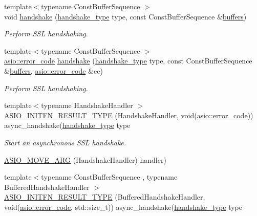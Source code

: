 \begin{DoxyCompactItemize}
{\footnotesize template$<$typename Const\+Buffer\+Sequence $>$ }\\void \hyperlink{classasio_1_1ssl_1_1stream_ae576e595f41b72459ded95b88cd870c8}{handshake} (\hyperlink{classasio_1_1ssl_1_1stream__base_a2f18813d3860bc8aee99249834d7c320}{handshake\+\_\+type} type, const Const\+Buffer\+Sequence \&\hyperlink{classasio_1_1ssl_1_1stream_aefa76c1cfe5178bd3e49d3fe06272133}{buffers})
\begin{DoxyCompactList}\small\item\em Perform S\+S\+L handshaking. \end{DoxyCompactList}\item 
{\footnotesize template$<$typename Const\+Buffer\+Sequence $>$ }\\\hyperlink{classasio_1_1error__code}{asio\+::error\+\_\+code} \hyperlink{classasio_1_1ssl_1_1stream_a7402b438c0c58c4e62bb5731fc168414}{handshake} (\hyperlink{classasio_1_1ssl_1_1stream__base_a2f18813d3860bc8aee99249834d7c320}{handshake\+\_\+type} type, const Const\+Buffer\+Sequence \&\hyperlink{classasio_1_1ssl_1_1stream_aefa76c1cfe5178bd3e49d3fe06272133}{buffers}, \hyperlink{classasio_1_1error__code}{asio\+::error\+\_\+code} \&ec)
\begin{DoxyCompactList}\small\item\em Perform S\+S\+L handshaking. \end{DoxyCompactList}\item 
{\footnotesize template$<$typename Handshake\+Handler $>$ }\\\hyperlink{classasio_1_1ssl_1_1stream_a87544b70cba88a500f12f85a3e747144}{A\+S\+I\+O\+\_\+\+I\+N\+I\+T\+F\+N\+\_\+\+R\+E\+S\+U\+L\+T\+\_\+\+T\+Y\+P\+E} (Handshake\+Handler, void(\hyperlink{classasio_1_1error__code}{asio\+::error\+\_\+code})) async\+\_\+handshake(\hyperlink{classasio_1_1ssl_1_1stream__base_a2f18813d3860bc8aee99249834d7c320}{handshake\+\_\+type} type
\begin{DoxyCompactList}\small\item\em Start an asynchronous S\+S\+L handshake. \end{DoxyCompactList}\item 
\hyperlink{classasio_1_1ssl_1_1stream_ae7bda66895d9126a0e1f1958cc979379}{A\+S\+I\+O\+\_\+\+M\+O\+V\+E\+\_\+\+A\+R\+G} (Handshake\+Handler) handler)
\item 
{\footnotesize template$<$typename Const\+Buffer\+Sequence , typename Buffered\+Handshake\+Handler $>$ }\\\hyperlink{classasio_1_1ssl_1_1stream_a1f1c2b5a0de63e714e3dd55b3b138894}{A\+S\+I\+O\+\_\+\+I\+N\+I\+T\+F\+N\+\_\+\+R\+E\+S\+U\+L\+T\+\_\+\+T\+Y\+P\+E} (Buffered\+Handshake\+Handler, void(\hyperlink{classasio_1_1error__code}{asio\+::error\+\_\+code}, std\+::size\+\_\+t)) async\+\_\+handshake(\hyperlink{classasio_1_1ssl_1_1stream__base_a2f18813d3860bc8aee99249834d7c320}{handshake\+\_\+type} type

\end{DoxyCompactItemize}
